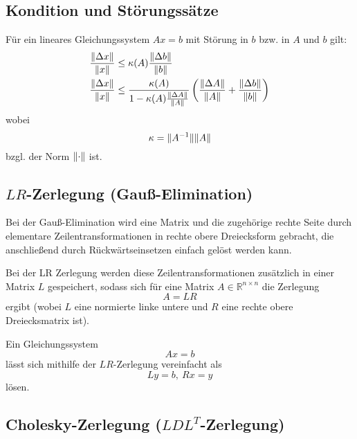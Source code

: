 \documentclass[a4paper,parskip=half*,DIV=7,fontsize=11pt]{scrartcl}
\DeclarePairedDelimiter\norm{\lVert}{\rVert}
\begin{document}
\subsection[Kondition und Störungssätze]{Kondition und Störungssätze}
Für ein lineares Gleichungssystem $Ax = b$ mit Störung in $b$ bzw. in $A$ und $b$ gilt:
\begin{align*}
	\frac{\norm{\Delta x}}{\norm{x}} &\leq \kappa(A) \frac{\norm{\Delta b}}{\norm{b}}	\\
    \frac{\norm{\Delta x}}{\norm{x}} &\leq \frac{\kappa(A)}{1-\kappa(A)\frac{\norm{\Delta A}}{\norm{A}}}\left(\frac{\norm{\Delta A}}{\norm{A}}+\frac{\norm{\Delta b}}{\norm{b}}\right)
\end{align*}
wobei
\[\kappa = \norm{A^{-1}}\norm{A}\]
bzgl. der Norm $\norm{\cdot}$ ist.

\subsection[LR-Zerlegung]{$LR$-Zerlegung (Gauß-Elimination)}

Bei der Gauß-Elimination wird eine Matrix und die zugehörige rechte Seite durch elementare Zeilentransformationen in rechte obere Dreiecksform gebracht, die anschließend durch Rückwärtseinsetzen einfach gelöst werden kann.

Bei der LR Zerlegung werden diese Zeilentransformationen zusätzlich in einer Matrix $L$ gespeichert, sodass sich für eine Matrix $A \in \mathbb{R}^{n \times n}$ die Zerlegung
\[A = LR\]
ergibt (wobei $L$ eine normierte linke untere und $R$ eine rechte obere Dreiecksmatrix ist).

Ein Gleichungssystem
\[Ax = b\]
lässt sich mithilfe der $LR$-Zerlegung vereinfacht als
\[Ly = b,~Rx = y\]
lösen.

\subsection[Cholesky-Zerlegung]{Cholesky-Zerlegung ($LDL^T$-Zerlegung)}
\end{document}
